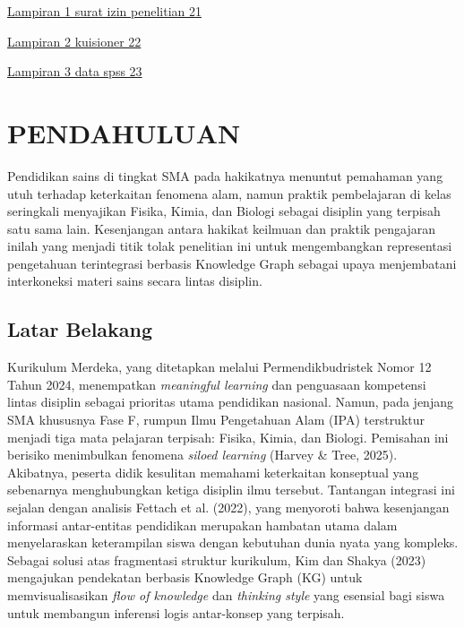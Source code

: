 \documentclass[
]{article}
\begin{document}
\protect\hyperlink{_4moq2jbvxxm5}{Lampiran 1 surat izin penelitian 21}

\protect\hyperlink{_raokolpcgoou}{Lampiran 2 kuisioner 22}

\protect\hyperlink{_uh6gz9aal5m}{Lampiran 3 data spss 23}

\hypertarget{section-1}{%
\section{}\label{section-1}}

\hypertarget{pendahuluan}{%
\section{\texorpdfstring{\hfill\break
PENDAHULUAN}{ PENDAHULUAN}}\label{pendahuluan}}

Pendidikan sains di tingkat SMA pada hakikatnya menuntut pemahaman yang
utuh terhadap keterkaitan fenomena alam, namun praktik pembelajaran di
kelas seringkali menyajikan Fisika, Kimia, dan Biologi sebagai disiplin
yang terpisah satu sama lain. Kesenjangan antara hakikat keilmuan dan
praktik pengajaran inilah yang menjadi titik tolak penelitian ini untuk
mengembangkan representasi pengetahuan terintegrasi berbasis Knowledge
Graph sebagai upaya menjembatani interkoneksi materi sains secara lintas
disiplin.

\hypertarget{latar-belakang}{%
\subsection{Latar Belakang}\label{latar-belakang}}

Kurikulum Merdeka, yang ditetapkan melalui Permendikbudristek Nomor 12
Tahun 2024, menempatkan \emph{meaningful learning} dan penguasaan
kompetensi lintas disiplin sebagai prioritas utama pendidikan nasional.
Namun, pada jenjang SMA khususnya Fase F, rumpun Ilmu Pengetahuan Alam
(IPA) terstruktur menjadi tiga mata pelajaran terpisah: Fisika, Kimia,
dan Biologi. Pemisahan ini berisiko menimbulkan fenomena \emph{siloed
learning} (Harvey \& Tree, 2025). Akibatnya, peserta didik kesulitan
memahami keterkaitan konseptual yang sebenarnya menghubungkan ketiga
disiplin ilmu tersebut. Tantangan integrasi ini sejalan dengan analisis
Fettach et al. (2022), yang menyoroti bahwa kesenjangan informasi
antar-entitas pendidikan merupakan hambatan utama dalam menyelaraskan
keterampilan siswa dengan kebutuhan dunia nyata yang kompleks. Sebagai
solusi atas fragmentasi struktur kurikulum, Kim dan Shakya (2023)
mengajukan pendekatan berbasis Knowledge Graph (KG) untuk
memvisualisasikan \emph{flow of knowledge} dan \emph{thinking style}
yang esensial bagi siswa untuk membangun inferensi logis antar-konsep
yang terpisah.
\end{document}
